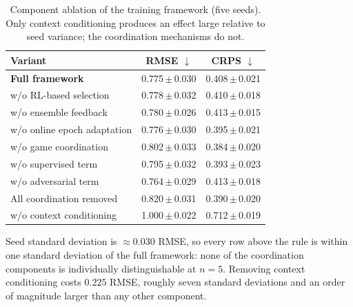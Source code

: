 \begin{table}[!t]
\centering
\caption{Component ablation of the training framework (five seeds). Only
context conditioning produces an effect large relative to seed variance; the
coordination mechanisms do not.}
\label{tab:ablation}
\begin{tabular}{lcc}
\toprule
Variant & RMSE $\downarrow$ & CRPS $\downarrow$ \\
\midrule
\textbf{Full framework}        & 0.775\,$\pm$\,0.030 & 0.408\,$\pm$\,0.021 \\
w/o RL-based selection         & 0.778\,$\pm$\,0.032 & 0.410\,$\pm$\,0.018 \\
w/o ensemble feedback          & 0.780\,$\pm$\,0.026 & 0.413\,$\pm$\,0.015 \\
w/o online epoch adaptation    & 0.776\,$\pm$\,0.030 & 0.395\,$\pm$\,0.021 \\
w/o game coordination          & 0.802\,$\pm$\,0.033 & 0.384\,$\pm$\,0.020 \\
w/o supervised term            & 0.795\,$\pm$\,0.032 & 0.393\,$\pm$\,0.023 \\
w/o adversarial term           & 0.764\,$\pm$\,0.029 & 0.413\,$\pm$\,0.018 \\
All coordination removed       & 0.820\,$\pm$\,0.031 & 0.390\,$\pm$\,0.020 \\
\midrule
w/o context conditioning       & 1.000\,$\pm$\,0.022 & 0.712\,$\pm$\,0.019 \\
\bottomrule
\end{tabular}
\begin{flushleft}\footnotesize
Seed standard deviation is $\approx 0.030$ RMSE, so every row above the rule is
within one standard deviation of the full framework: none of the coordination
components is individually distinguishable at $n=5$. Removing context
conditioning costs $0.225$ RMSE, roughly seven standard deviations and an order
of magnitude larger than any other component.
\end{flushleft}
\end{table}
